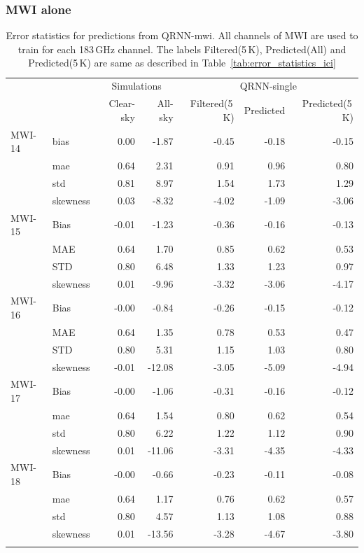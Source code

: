 \documentclass[amt, manuscript]{copernicus}
\begin{document}
\subsubsection{MWI alone}
%
\begin{table}[t]
	\caption{Error statistics for predictions from QRNN-mwi. All channels of MWI are used to train for each 183\,GHz channel. The labels Filtered(5\,K), Predicted(All) and Predicted(5\,K) are same as described in Table~\ref{tab:error_statistics_ici}}
	\label{tab:statistics_mwi-alone}
	\begin{tabular}{llrr|rrr}
		\tophline
		&&\multicolumn{2}{c|}{Simulations}& \multicolumn{3}{c}{QRNN-single} \\
		\cline{3-7}
		&&   Clear-sky &   All-sky &  Filtered(5\,K) & Predicted & Predicted(5\,K) \\
		\middlehline
		MWI-14 		&bias     & 0.00 & -1.87 & -0.45 & -0.18 & -0.15 \\
					&mae      & 0.64 &  2.31 &  0.91 &  0.96 &  0.80 \\
					&std      & 0.81 &  8.97 &  1.54 &  1.73 &  1.29 \\
					&skewness & 0.03 & -8.32 & -4.02 & -1.09 & -3.06 \\
		\middlehline
		MWI-15 		&Bias     & -0.01 & -1.23 & -0.36 & -0.16 & -0.13 \\
					&MAE      &  0.64 &  1.70 &  0.85 &  0.62 &  0.53 \\
					&STD      &  0.80 &  6.48 &  1.33 &  1.23 &  0.97 \\
					&skewness &  0.01 & -9.96 & -3.32 & -3.06 & -4.17 \\
		\middlehline	
		MWI-16 		&Bias     & -0.00 &  -0.84 & -0.26 & -0.15 & -0.12 \\
					&MAE      &  0.64 &   1.35 &  0.78 &  0.53 &  0.47 \\
					&STD      &  0.80 &   5.31 &  1.15 &  1.03 &  0.80 \\
					&skewness & -0.01 & -12.08 & -3.05 & -5.09 & -4.94 \\	
		\middlehline			
		MWI-17 		&Bias     & -0.00 &  -1.06 & -0.31 & -0.16 & -0.12 \\
					&mae      &  0.64 &   1.54 &  0.80 &  0.62 &  0.54 \\
					&std      &  0.80 &   6.22 &  1.22 &  1.12 &  0.90 \\
					&skewness &  0.01 & -11.06 & -3.31 & -4.35 & -4.33 \\	
		\middlehline			
		MWI-18 		&Bias     & -0.00 &  -0.66 & -0.23 & -0.11 & -0.08 \\
					&mae      &  0.64 &   1.17 &  0.76 &  0.62 &  0.57 \\
					&std      &  0.80 &   4.57 &  1.13 &  1.08 &  0.88 \\
					&skewness &  0.01 & -13.56 & -3.28 & -4.67 & -3.80 \\	
		\bottomhline				
	\end{tabular}	
	\belowtable{} %
\end{table}
\end{document}
